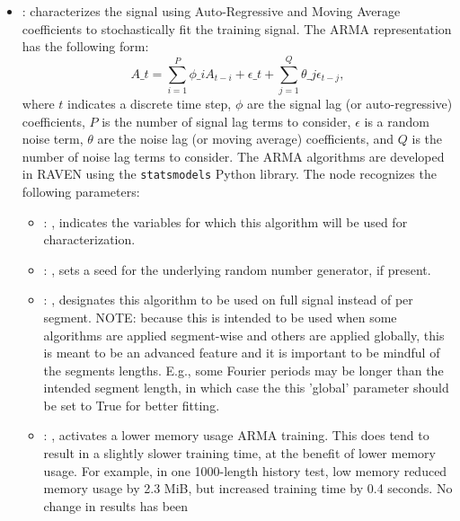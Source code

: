 \begin{itemize}
    \item {}:
      characterizes the signal using Auto-Regressive and Moving Average         coefficients to
      stochastically fit the training signal.         The ARMA representation has the following
      form:         \begin{equation*}           A\_t = \sum_{i=1}^P \phi\_i A_{t-i} + \epsilon\_t +
      \sum_{j=1}^Q \theta\_j \epsilon_{t-j},         \end{equation*}         where $t$ indicates a
      discrete time step, $\phi$ are the signal lag (or auto-regressive)         coefficients, $P$
      is the number of signal lag terms to consider, $\epsilon$ is a random noise         term,
      $\theta$ are the noise lag (or moving average) coefficients, and $Q$ is the number of
      noise lag terms to consider. The ARMA algorithms are developed in RAVEN using the
      \texttt{statsmodels} Python library.
      The  node recognizes the following parameters:
        \begin{itemize}
          \item {}: , 
            indicates the variables for which this algorithm will be used for characterization.
          \item {}: , 
            sets a seed for the underlying random number generator, if present.
          \item {}: , 
            designates this algorithm to be used on full signal instead of per
            segment. NOTE: because this is intended to be used when some algorithms are
            applied segment-wise and others are applied globally, this is meant to be an
            advanced feature and it is important to be mindful of the segments lengths.
            E.g., some Fourier periods may be longer than the intended segment length, in
            which case the this 'global' parameter should be set to True for better
            fitting. 
          \item {}: , 
            activates a lower memory usage ARMA training. This does tend to result
            in a slightly slower training time, at the benefit of lower memory usage. For
            example, in one 1000-length history test, low memory reduced memory usage by 2.3
            MiB, but increased training time by 0.4 seconds. No change in results has been

\end{itemize}
\end{itemize}
